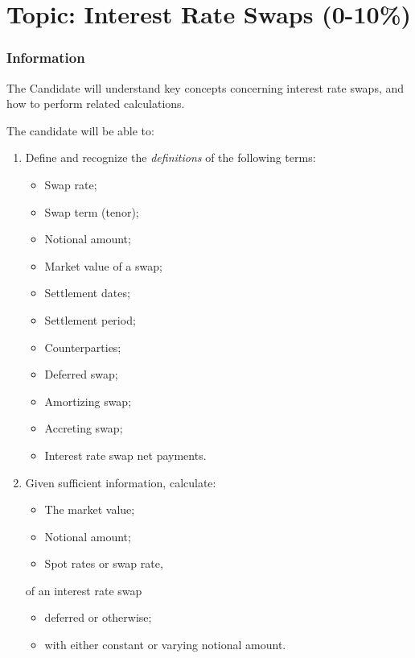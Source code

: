 \chapter[Topic: Interest Rate Swaps]{Topic: Interest Rate Swaps (0-10\%)}

\subsection{Information}

\begin{distributions}[Objective]
The Candidate will understand key concepts concerning interest rate swaps, and how to perform related calculations.
\end{distributions}

\begin{outcomes}
The candidate will be able to:
\begin{enumerate}[label = \alph*)]
	\item	Define and recognize the \textit{definitions} of the following terms:
		\begin{multicols*}{2}
		\begin{itemize}[leftmargin = *]
		\item	Swap rate;
		\item	Swap term (tenor);
		\item	Notional amount;
		\item	Market value of a swap;
		\item	Settlement dates;
		\item	Settlement period;
		\item	Counterparties;
		\item	Deferred swap;
		\item	Amortizing swap;
		\item	Accreting swap;
		\item	Interest rate swap net payments.
		\end{itemize}
		\end{multicols*}
	\item	Given sufficient information, calculate: 
		\begin{multicols*}{2}
		\begin{itemize}[leftmargin = *]
		\item	The market value;
		\item	Notional amount;
		\item	Spot rates or swap rate,
		\end{itemize}
		of an interest rate swap
		\begin{itemize}[leftmargin = *]
		\item	deferred or otherwise;
		\item	with either constant or varying notional amount.
		\end{itemize}
		\end{multicols*}
\end{enumerate}
\end{outcomes}

